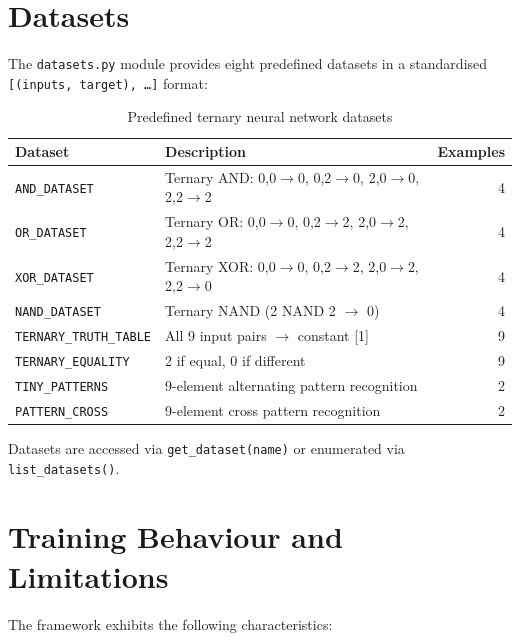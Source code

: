 \documentclass[10pt,a4paper,twoside]{book}
\begin{document}
\section{Datasets}

The \texttt{datasets.py} module provides eight predefined datasets in a
standardised \texttt{[(inputs, target), \ldots]} format:

\begin{table}[H]
\centering
\caption{Predefined ternary neural network datasets}
\label{tab:nndatasets}
\begin{tabular}{llr}
\toprule
Dataset & Description & Examples \\
\midrule
\texttt{AND\_DATASET}    & Ternary AND: 0,0$\rightarrow$0, 0,2$\rightarrow$0, 2,0$\rightarrow$0, 2,2$\rightarrow$2 & 4 \\
\texttt{OR\_DATASET}     & Ternary OR: 0,0$\rightarrow$0, 0,2$\rightarrow$2, 2,0$\rightarrow$2, 2,2$\rightarrow$2  & 4 \\
\texttt{XOR\_DATASET}    & Ternary XOR: 0,0$\rightarrow$0, 0,2$\rightarrow$2, 2,0$\rightarrow$2, 2,2$\rightarrow$0 & 4 \\
\texttt{NAND\_DATASET}   & Ternary NAND (2 NAND 2 $\rightarrow$ 0) & 4 \\
\texttt{TERNARY\_TRUTH\_TABLE} & All 9 input pairs $\rightarrow$ constant [1] & 9 \\
\texttt{TERNARY\_EQUALITY}    & 2 if equal, 0 if different & 9 \\
\texttt{TINY\_PATTERNS}  & 9-element alternating pattern recognition & 2 \\
\texttt{PATTERN\_CROSS}  & 9-element cross pattern recognition & 2 \\
\bottomrule
\end{tabular}
\end{table}

Datasets are accessed via \texttt{get\_dataset(name)} or enumerated via
\texttt{list\_datasets()}.

\section{Training Behaviour and Limitations}

The framework exhibits the following characteristics:
\end{document}
